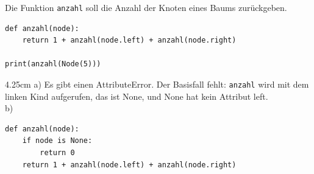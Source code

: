 \question[3]
Die Funktion \texttt{anzahl} soll die Anzahl der Knoten eines Baums zurückgeben.
\begin{lstlisting}
def anzahl(node):
    return 1 + anzahl(node.left) + anzahl(node.right)

print(anzahl(Node(5)))
\end{lstlisting}
\begin{solutionbox}{4.25cm}
a) Es gibt einen AttributeError. Der Basisfall fehlt: \texttt{anzahl} wird mit dem linken Kind aufgerufen, das ist None, und None hat kein Attribut left.\\
b)
\begin{lstlisting}
def anzahl(node):
    if node is None:
        return 0
    return 1 + anzahl(node.left) + anzahl(node.right)
\end{lstlisting}
\end{solutionbox}
